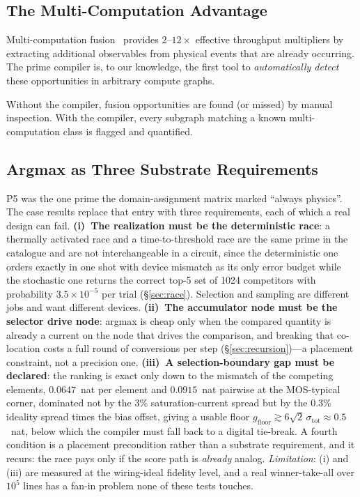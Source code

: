 \documentclass[11pt]{article}
\begin{document}
\subsection{The Multi-Computation Advantage}

Multi-computation fusion~\cite{bieg2026} provides $2$--$12\times$ effective throughput multipliers by extracting additional observables from physical events that are already occurring. The prime compiler is, to our knowledge, the first tool to \textit{automatically detect} these opportunities in arbitrary compute graphs.

Without the compiler, fusion opportunities are found (or missed) by manual inspection. With the compiler, every subgraph matching a known multi-computation class is flagged and quantified.

\subsection{Argmax as Three Substrate Requirements}
\label{sec:argmax}

P5 was the one prime the domain-assignment matrix marked ``always physics''. The case results replace that entry with three requirements, each of which a real design can fail. \textbf{(i)~The realization must be the deterministic race}: a thermally activated race and a time-to-threshold race are the same prime in the catalogue and are not interchangeable in a circuit, since the deterministic one orders exactly in one shot with device mismatch as its only error budget while the stochastic one returns the correct top-5 set of 1024 competitors with probability $3.5\times10^{-5}$ per trial (\S\ref{sec:race}). Selection and sampling are different jobs and want different devices. \textbf{(ii)~The accumulator node must be the selector drive node}: argmax is cheap only when the compared quantity is already a current on the node that drives the comparison, and breaking that co-location costs a full round of conversions per step (\S\ref{sec:recursion})---a placement constraint, not a precision one. \textbf{(iii)~A selection-boundary gap must be declared}: the ranking is exact only down to the mismatch of the competing elements, $0.0647$~nat per element and $0.0915$~nat pairwise at the MOS-typical corner, dominated not by the $3\%$ saturation-current spread but by the $0.3\%$ ideality spread times the bias offset, giving a usable floor $g_{\mathrm{floor}} \gtrsim 6\sqrt2\,\sigma_{\mathrm{tot}} \approx 0.5$~nat, below which the compiler must fall back to a digital tie-break. A fourth condition is a placement precondition rather than a substrate requirement, and it recurs: the race pays only if the score path is \textit{already} analog. \textit{Limitation}: (i) and (iii) are measured at the wiring-ideal fidelity level, and a real winner-take-all over $10^5$ lines has a fan-in problem none of these tests touches.
\end{document}
